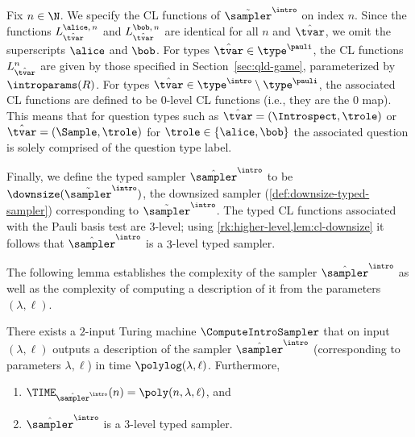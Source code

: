 Fix $n \in \N$.
We specify the CL functions of $\tilde{\sampler}^\intro$ on index $n$.
Since the functions $L_{\hat{\tvar}}^{\alice,\, n}$ and
$L_{\hat{\tvar}}^{\bob,\, n}$ are identical for all $n$ and $\hat{\tvar}$, we
omit the superscripts $\alice$ and $\bob$.
For types $\hat{\tvar} \in \type^\pauli$, the CL functions $L_{\hat{\tvar}}^n$
are given by those specified in Section~\ref{sec:qld-game}, parameterized by
$\introparams(R)$.
For types $\hat{\tvar} \in \type^\intro \setminus \type^\pauli$, the associated
CL functions are defined to be $0$-level CL functions (i.e., they are the $0$
map).
This means that for question types such as $\hat{\tvar}=(\Introspect, \trole)$
or $\hat{\tvar}=(\Sample, \trole)$ for $\trole\in\{\alice,\bob\}$ the associated question is solely comprised
of the question type label.

Finally, we define the typed sampler $\tsint$ to be
$\downsize(\tilde{\sampler}^\intro)$, the downsized sampler
(\cref{def:downsize-typed-sampler}) corresponding to $\tilde{\sampler}^\intro$.
The typed CL functions associated with
the Pauli basis test are $3$-level; using \cref{rk:higher-level,lem:cl-downsize}
it follows that $\tsint$ is a $3$-level typed sampler.

The following lemma establishes the complexity of the sampler $\tsint$
as well as the complexity of computing a {description} of it from the parameters
$(\lambda,\ell)$.
\begin{lemma}
  \label{lem:intro-sampler-complexity}
  There exists a $2$-input Turing machine $\ComputeIntroSampler$ that
  on input $(\lambda,\ell)$ outputs a description of the sampler
  $\tsint$ (corresponding to parameters $\lambda,\ell$) in time $\polylog(\lambda,\ell)$.
  Furthermore, 
  \begin{enumerate}
  \item $\TIME_{\tsint}(n) = \poly(n, \lambda, \ell)$, and
	\item $\tsint$  is a $3$-level typed sampler.
  \end{enumerate}
\end{lemma}

